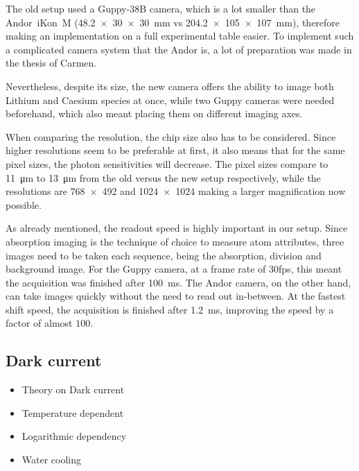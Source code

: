 The old setup used a Guppy-38B camera, which is a lot smaller than the Andor~iKon~M  (\SI{48.2x30x30}{\milli\meter} vs \SI{204.2x105x107}{\milli\meter}), therefore making an implementation on a full experimental table easier. To implement such a complicated camera system that the Andor is, a lot of preparation was made in the thesis of Carmen. 

Nevertheless, despite its size, the new camera offers the ability to image both Lithium and Caesium species at once, while two Guppy cameras were needed beforehand, which also meant placing them on different imaging axes.

When comparing the resolution, the chip size also has to be considered. Since higher resolutions seem to be preferable at first, it also means that for the same pixel sizes, the photon sensitivities will decrease. The pixel sizes compare to \SI{11}{\micro\meter} to \SI{13}{\micro\meter} from the old versus the new setup respectively, while the resolutions are \SI{768x492}{} and \SI{1024x1024}{} making a larger magnification now possible.

As already mentioned, the readout speed is highly important in our setup. Since absorption imaging is the technique of choice to measure atom attributes, three images need to be taken each sequence, being the absorption, division and background image.
For the Guppy camera, at a frame rate of 30fps, this meant the acquisition was finished after \SI{100}{\milli\second}. The Andor camera, on the other hand, can take images quickly without the need to read out in-between. At the fastest shift speed, the acquisition is finished after \SI{1.2}{\milli\second}, improving the speed by a factor of almost $100$.

\subsection{Dark current}
\begin{itemize}
	\item Theory on Dark current
	\item Temperature dependent
	\item Logarithmic dependency
	\item Water cooling
\end{itemize}

